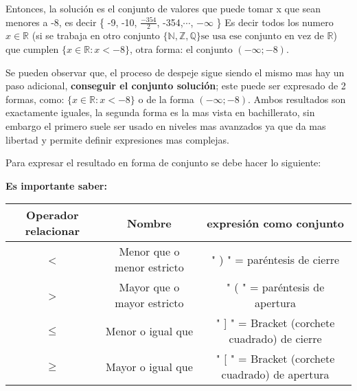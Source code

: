\documentclass[12pt]{article}
\begin{document}
    Entonces, la solución es el conjunto de valores que puede tomar x que sean
    menores a -8, es decir \{ -9, -10, $\displaystyle\frac{-354}{2} $, -354,$\cdots$, $-\infty$   \}
    Es decir todos los numero $x \in \mathbb{R}$ (si se trabaja en otro conjunto
    $\{\mathbb{N},\mathbb{Z},\mathbb{Q}\} \text{se usa ese conjunto en vez de }\mathbb{R}$)
    que cumplen $\{x \in \mathbb{R}:x < -8\}$, otra forma: el conjunto $(-\infty;-8)$.

    Se pueden observar que, el proceso de despeje sigue siendo el mismo mas hay
    un paso adicional, \textbf{conseguir el conjunto solución}; este puede ser
    expresado de 2 formas, como: $\{x \in \mathbb{R}:x < -8\}$ o de la forma
    $(-\infty;-8)$. Ambos resultados son exactamente iguales, la segunda forma
    es la mas vista en bachillerato, sin embargo el primero suele
    ser usado en niveles mas avanzados ya que da mas libertad y permite definir
    expresiones mas complejas.

    Para expresar el resultado en forma de conjunto se debe hacer lo siguiente:

    \textbf{Es importante saber: }


\begin{table}[H] \label{operadores-relacionales-a-conjuntos}
    \begin{adjustwidth}{-.5in}{-.5in}
        \begin{center}

            \begin{tabular}{|c|c|c|}
                \hline


                Operador relacionar & Nombre                        & expresión como conjunto\\\hline
                <                   & Menor que o menor estricto    & " ) " = paréntesis de cierre \\\hline
                >                   & Mayor que o mayor estricto    & " ( " = paréntesis de apertura\\\hline
                $\leq$              & Menor o igual que             & " ] " = Bracket (corchete cuadrado) de cierre \\\hline
                $\geq$              & Mayor o igual que             & " [ " = Bracket (corchete cuadrado) de apertura \\

                \hline
            \end{tabular}

        \end{center}
    \end{adjustwidth}
\end{table}
\end{document}
